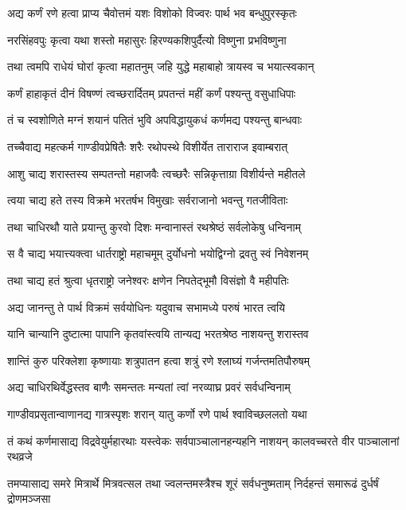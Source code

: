 \twolineshloka
{अद्य कर्णं रणे हत्वा प्राप्य चैवोत्तमं यशः}
{विशोको विज्वरः पार्थ भव बन्धुपुरस्कृतः}


\twolineshloka
{नरसिंहवपुः कृत्वा यथा शस्तो महासुरः}
{हिरण्यकशिपुर्दैत्यो विष्णुना प्रभविष्णुना}


\twolineshloka
{तथा त्वमपि राधेयं घोरां कृत्वा महातनुम्}
{जहि युद्धे महाबाहो त्रायस्व च भयात्स्वकान्}


\twolineshloka
{कर्णं हाहाकृतं दीनं विषण्णं त्वच्छरार्दितम्}
{प्रपतन्तं महीं कर्णं पश्यन्तु वसुधाधिपाः}


\twolineshloka
{तं च स्वशोणिते मग्नं शयानं पतितं भुवि}
{अपविद्धायुकधं कर्णमद्य पश्यन्तु बान्धवाः}


\twolineshloka
{तच्चैवाद्य महत्कर्म गाण्डीवप्रेषितैः शरैः}
{रथोपस्थे विशीर्येत ताराराज इवाम्बरात्}


\twolineshloka
{आशु चाद्य शरास्तस्य सम्पतन्तो महाजवैः}
{त्वच्छरैः सन्निकृत्ताग्रा विशीर्यन्ते महीतले}


\twolineshloka
{त्वया चाद्य हते तस्य विक्रमे भरतर्षभ}
{विमुखाः सर्वराजानो भवन्तु गतजीविताः}


\twolineshloka
{तथा चाधिरथौ याते प्रयान्तु कुरवो दिशः}
{मन्वानास्तं रथश्रेष्ठं सर्वलोकेषु धन्विनाम्}


\twolineshloka
{स वै चाद्य भयात्त्यक्त्वा धार्तराष्ट्रो महाचमूम्}
{दुर्योधनो भयोद्विग्नो द्रवतु स्वं निवेशनम्}


\twolineshloka
{तथा चाद्य हतं श्रुत्वा धृतराष्ट्रो जनेश्वरः}
{क्षणेन निपतेद्भूमौ विसंज्ञो वै महीपतिः}


\twolineshloka
{अद्य जानन्तु ते पार्थ विक्रमं सर्वयोधिनः}
{यदुवाच सभामध्ये परुषं भारत त्वयि}


\twolineshloka
{यानि चान्यानि दुष्टात्मा पापानि कृतवांस्त्वयि}
{तान्यद्य भरतश्रेष्ठ नाशयन्तु शरास्तव}


\twolineshloka
{शान्तिं कुरु परिक्लेशा कृष्णायाः शत्रुपातन}
{हत्वा शत्रुं रणे श्लाघ्यं गर्जन्तमतिपौरुषम्}


\twolineshloka
{अद्य चाधिरथिर्वेद्धस्तव बाणैः समन्ततः}
{मन्यतां त्वां नरव्याघ्र प्रवरं सर्वधन्विनाम्}


\twolineshloka
{गाण्डीवप्रसृतान्वाणानद्य गात्रस्पृशः शरान्}
{यातु कर्णो रणे पार्थ श्वाविच्छललतो यथा}


\threelineshloka
{तं कथं कर्णमासाद्य विद्रवेयुर्महारथाः}
{यस्त्वेकः सर्वपाञ्चालानहन्यहनि नाशयन्}
{कालवच्चरते वीर पाञ्चालानां रथव्रजे}


\threelineshloka
{तमप्यासाद्य समरे मित्रार्थे मित्रवत्सल}
{तथा ज्वलन्तमस्त्रैश्च शूरं सर्वधनुष्मताम्}
{निर्दहन्तं समारूढं दुर्धर्षं द्रोणमञ्जसा}


